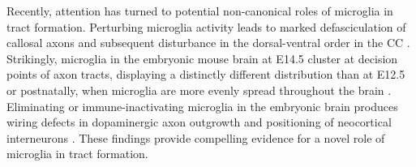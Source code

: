 Recently, attention has turned to potential non-canonical roles of microglia in tract formation.
Perturbing microglia activity leads to marked defasciculation of callosal axons and subsequent disturbance in the dorsal-ventral order in the CC \cite{pont2014microglia}.
Strikingly, microglia in the embryonic mouse brain at E14.5 cluster at decision points of axon tracts, displaying a distinctly different distribution than at E12.5 or postnatally, when microglia are more evenly spread throughout the brain \cite{squarzoni2014microglia}.
Eliminating or immune-inactivating microglia in the embryonic brain produces wiring defects in dopaminergic axon outgrowth and positioning of neocortical interneurons \cite{squarzoni2014microglia}.
These findings provide compelling evidence for a novel role of microglia in tract formation.